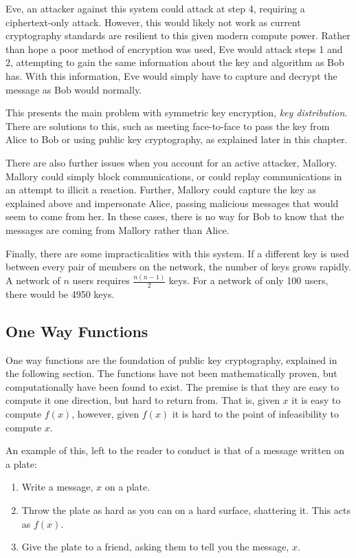 				Eve, an attacker against this system could attack at step 4, requiring a ciphertext-only attack. 
				However, this would likely not work as current cryptography standards are resilient to this given modern compute power. 
				Rather than hope a poor method of encryption was used, Eve would attack steps 1 and 2, 
				attempting to gain the same information about the key and algorithm as Bob has. 
				With this information, Eve would simply have to capture and decrypt the message as Bob would normally. 

				This presents the main problem with symmetric key encryption, \emph{key distribution}. 
				There are solutions to this, such as meeting face-to-face to pass the key from Alice to Bob or 
				using public key cryptography, as explained later in this chapter. 

				There are also further issues when you account for an active attacker, Mallory. 
				Mallory could simply block communications, or could replay communications in an attempt to illicit a reaction. 
				Further, Mallory could capture the key as explained above and impersonate Alice, passing malicious messages that would seem to come from her. 
				In these cases, there is no way for Bob to know that the messages are coming from Mallory rather than Alice. 

				Finally, there are some impracticalities with this system. 
				If a different key is used between every pair of members on the network, the number of keys grows rapidly. 
				A network of $n$ users requires $\frac{n(n-1)}{2}$ keys. 
				For a network of only 100 users, there would be 4950 keys. 
			\subsection{One Way Functions}
				One way functions are the foundation of public key cryptography, explained in the following section. 
				The functions have not been mathematically proven, but computationally have been found to exist. 
				The premise is that they are easy to compute it one direction, but hard to return from. 
				That is, given $x$ it is easy to compute $f(x)$, 
				however, given $f(x)$ it is hard to the point of infeasibility to compute $x$. 

				An example of this, left to the reader to conduct is that of a message written on a plate:
				\begin{enumerate}
					\item Write a message, $x$ on a plate. 
					\item Throw the plate as hard as you can on a hard surface, shattering it. 
						This acts as $f(x)$. 
					\item Give the plate to a friend, asking them to tell you the message, $x$. 
				\end{enumerate}

